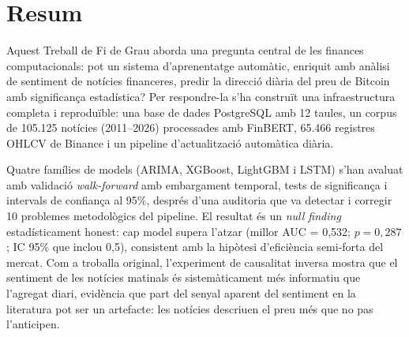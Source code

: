 \documentclass[12pt, a4paper]{report}
\begin{document}



\chapter*{Resum}
\begingroup{}

Aquest Treball de Fi de Grau aborda una pregunta central de les finances computacionals: pot un sistema d'aprenentatge automàtic, enriquit amb anàlisi de sentiment de notícies financeres, predir la direcció diària del preu de Bitcoin amb significança estadística? Per respondre-la s'ha construït una infraestructura completa i reproduïble: una base de dades PostgreSQL amb 12 taules, un corpus de 105.125 notícies (2011--2026) processades amb FinBERT, 65.466 registres OHLCV de Binance i un pipeline d'actualització automàtica diària.

Quatre famílies de models (ARIMA, XGBoost, LightGBM i LSTM) s'han avaluat amb validació \textit{walk-forward} amb embargament temporal, tests de significança i intervals de confiança al 95\%, després d'una auditoria que va detectar i corregir 10 problemes metodològics del pipeline. El resultat és un \textit{null finding} estadísticament honest: cap model supera l'atzar (millor AUC = 0,532; $p = 0{,}287$; IC 95\% que inclou 0,5), consistent amb la hipòtesi d'eficiència semi-forta del mercat. Com a troballa original, l'experiment de causalitat inversa mostra que el sentiment de les notícies matinals és sistemàticament més informatiu que l'agregat diari, evidència que part del senyal aparent del sentiment en la literatura pot ser un artefacte: les notícies descriuen el preu més que no pas l'anticipen.
\end{document}
